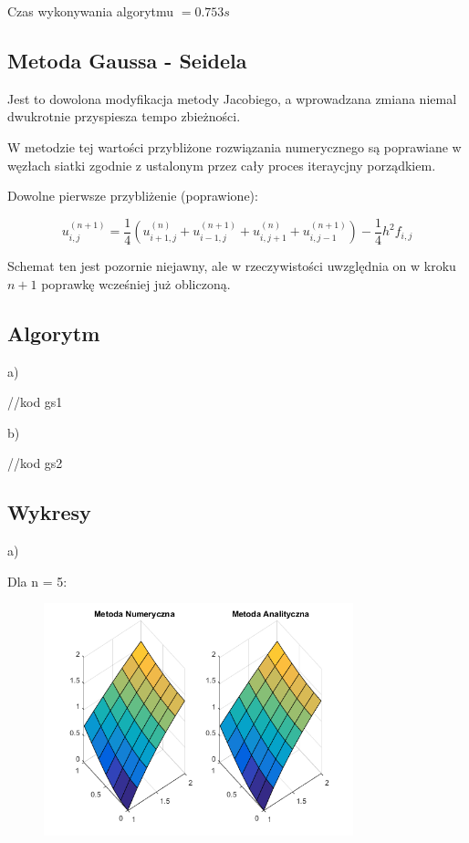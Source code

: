 Czas wykonywania algorytmu $ = 0.753 s$


\subsection{Metoda Gaussa - Seidela	}

Jest to dowolona modyfikacja metody Jacobiego, a wprowadzana zmiana niemal dwukrotnie przyspiesza tempo zbieżności.

W metodzie tej wartości przybliżone rozwiązania numerycznego są poprawiane w węzłach siatki zgodnie z ustalonym przez cały proces iteraycjny porządkiem.

Dowolne pierwsze przybliżenie (poprawione):

$$u_{i,j}^{(n+1)} = \frac{1}{4}(u_{i+1,j}^{(n)} + u_{i-1,j}^{(n+1)} + u_{i,j+1}^{(n)} + u_{i,j-1}^{(n+1)}) - \frac{1}{4}h^2f_{i,j}$$

Schemat ten jest pozornie niejawny, ale w rzeczywistości uwzględnia on w kroku $n+1$ poprawkę wcześniej już obliczoną.

\subsection{Algorytm}

a)

//kod gs1

b)

//kod gs2

\subsection{Wykresy}

a)

Dla n = 5:

\begin{figure}[!ht]
	\begin{center}
		\includegraphics[width=0.8\textwidth]{Lab6/charts/gs/zad1/5.png}
	\end{center}
\end{figure}

